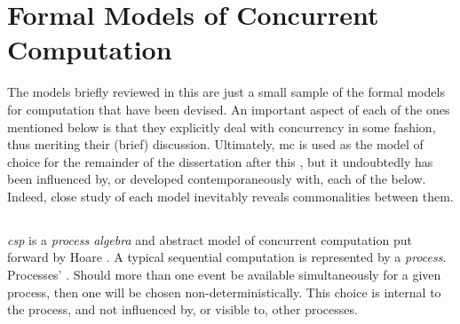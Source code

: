 \section{\label{sec:back:formalmodels}Formal Models of Concurrent Computation}


The models briefly reviewed in this  are just a small sample of the formal models for computation that have been devised.  An important aspect of each of the ones mentioned below is that they explicitly deal with concurrency in some fashion, thus meriting their (brief) discussion.  Ultimately, \gls{mc} is used as the model of choice for the remainder of the dissertation after this , but it undoubtedly has been influenced by, or developed contemporaneously with, each of the below.  Indeed, close study of each model inevitably reveals commonalities between them.

\subsection{\label{subsec:back:csp}}

\emph{\Gls{csp}} is a \emph{process algebra} and abstract model of concurrent computation put forward by Hoare \cite{Hoare1985,Roscoe2011}.  A typical sequential computation is represented by a \emph{process}.  Processes' .  Should more than one event be available simultaneously for a given process, then one will be chosen non-deterministically.  This choice is internal to the process, and not influenced by, or visible to, other processes.

